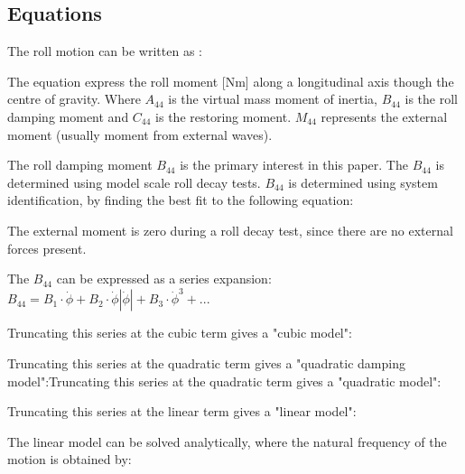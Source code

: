 \subsection{Equations}
\label{se:equations}
The roll motion can be written as \cite{himeno_prediction_1981}:


The equation express the roll moment [Nm] along a longitudinal axis though the centre of gravity.
Where $A_{44}$ is the virtual mass moment of inertia, $B_{44}$ is the roll damping moment and $C_{44}$ is the restoring moment. $M_{44}$ represents the external moment (usually moment from external waves).

The roll damping moment $B_{44}$ is the primary interest in this paper. The $B_{44}$ is determined using model scale roll decay tests. $B_{44}$ is determined using system identification, by finding the best fit to the following equation:

The external moment is zero during a roll decay test, since there are no external forces present.

The $B_{44}$ can be expressed as a series expansion:  
$ B_{44} = B_1\cdot\dot{\phi} + B_2\cdot\dot{\phi}\left|\dot{\phi}\right| + B_3\cdot\dot{\phi}^3 + ...$

Truncating this series at the cubic term gives a "cubic model":


Truncating this series at the quadratic term gives a "quadratic damping model":Truncating this series at the quadratic term gives a "quadratic model":


Truncating this series at the linear term gives a "linear model":


The linear model \cite{henry_peter_piehl_ship_nodate} can be solved analytically, where the natural frequency of the motion is obtained by:

